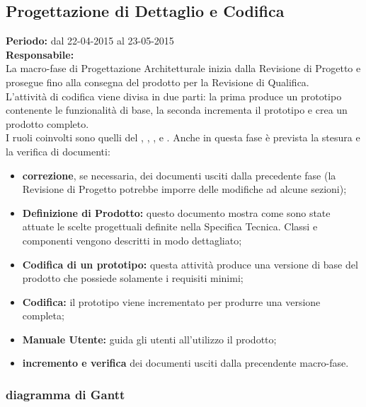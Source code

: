 \newpage
\subsection{Progettazione di Dettaglio e Codifica}
\textbf{Periodo:} dal 22-04-2015 al 23-05-2015 \\
\textbf{Responsabile:} \CoMa \\
La macro-fase di Progettazione Architetturale inizia dalla Revisione di Progetto e prosegue fino alla consegna del prodotto per la Revisione di Qualifica. \\
L'attività di codifica viene divisa in due parti: la prima produce un prototipo contenente le funzionalità di base, la seconda incrementa il prototipo e crea un prodotto completo. \\
I ruoli coinvolti sono quelli del \ruoloResponsabile{}, \ruoloAmministratore{}, \ruoloProgettista{}, \ruoloVerificatore{} e \ruoloProgrammatore{}.
Anche in questa fase è prevista la stesura e la verifica di documenti:
\begin{itemize}
\item \textbf{correzione}, se necessaria, dei documenti usciti dalla precedente fase (la Revisione di Progetto potrebbe imporre delle modifiche ad alcune sezioni);
\item \textbf{Definizione di Prodotto:} questo documento mostra come sono state attuate le scelte progettuali definite nella Specifica Tecnica. Classi e componenti vengono descritti in modo dettagliato;
\item \textbf{Codifica di un prototipo:} questa attività produce una versione di base del prodotto che possiede solamente i requisiti minimi;
\item \textbf{Codifica:} il prototipo viene incrementato per produrre una versione completa;
\item \textbf{Manuale Utente:} guida gli utenti all'utilizzo il prodotto;
\item \textbf{incremento e verifica} dei documenti usciti dalla precendente macro-fase.
\end{itemize}

\newpage
\subsubsection{diagramma di Gantt}


